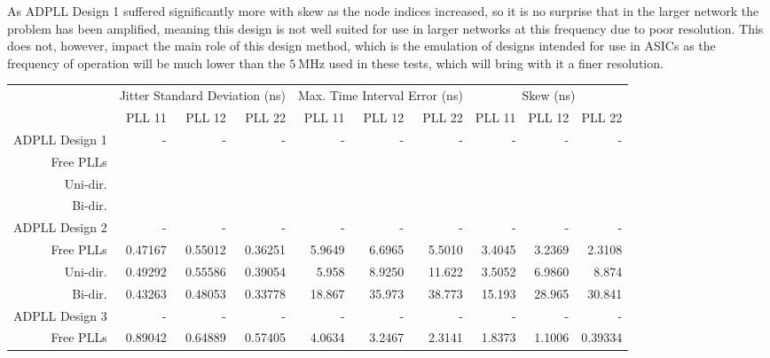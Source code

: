 As \ac{ADPLL} Design 1 suffered significantly more with skew as the node indices increased, so it is no surprise that in the larger network the problem has been amplified, meaning this design is not well suited for use in larger networks at this frequency due to poor resolution. This does not, however, impact the main role of this design method, which is the emulation of designs intended for use in \ac{ASIC}s as the frequency of operation will be much lower than the $5~\si{\mega\hertz}$ used in these tests, which will bring with it a finer resolution.
\begin{table}[!ht]
    \begin{center}
        \begin{footnotesize}
            \setlength{\tabcolsep}{.9\tabcolsep}
            \begin{tabular}{ll|r|r|r|r|r|r|r|r|r|}           
                \cline{3-11}
                && \multicolumn{3}{c|}{Jitter Standard Deviation (ns)} & \multicolumn{3}{c|}{Max. Time Interval Error (ns)} & \multicolumn{3}{c|}{Skew (ns)} \T\\
                \cline{3-11} 
                &&PLL 11&PLL 12&PLL 22    &PLL 11&PLL 12&PLL 22    &PLL 11&PLL 12&PLL 22\T\\
                \hline
                \multicolumn{2}{|l|}{\ac{ADPLL} Design 1}&-&-&-&-&-&-&-&-&-\T\\
                \multicolumn{2}{|r|}{Free PLLs} &&& &&& &&& \T\\
                \multicolumn{2}{|r|}{Uni-dir.}  &&& &&& &&& \T\\
                \multicolumn{2}{|r|}{Bi-dir.}   &&& &&& &&& \T\\
                \hline
                \multicolumn{2}{|l|}{\ac{ADPLL} Design 2}&-&-&-&-&-&-&-&-&-\T\\
                \multicolumn{2}{|r|}{Free PLLs} &0.47167 &0.55012 &0.36251    &5.9649 &6.6965 &5.5010    &3.4045&3.2369&2.3108 \T\\
                \multicolumn{2}{|r|}{Uni-dir.}  &0.49292 &0.55586 &0.39054    &5.958  &8.9250 &11.622    &3.5052&6.9860&8.874 \T\\
                \multicolumn{2}{|r|}{Bi-dir.}   &0.43263 &0.48053 &0.33778    &18.867 &35.973 &38.773    &15.193&28.965&30.841 \T\\
                \hline
                \multicolumn{2}{|l|}{\ac{ADPLL} Design 3}&-&-&-&-&-&-&-&-&-\T\\
                \multicolumn{2}{|r|}{Free PLLs} &0.89042 &0.64889 &0.57405    &4.0634 &3.2467 &2.3141    &1.8373&1.1006&0.39334 \T\\

\end{tabular}
\end{footnotesize}
\end{center}
\end{table}
